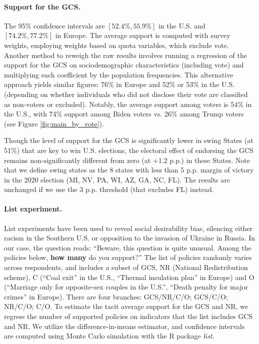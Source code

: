 \begin{bibunit}
\begin{small}
\paragraph{\small Support for the GCS.} 
The 95\% confidence intervals are $[52.4\%, 55.9\%]$ in the U.S. and $[74.2\%, 77.2\%]$ in Europe. The average support is computed with survey weights, employing weights based on quota variables, which exclude vote. Another method to reweigh the raw results involves running a regression of the support for the GCS on sociodemographic characteristics (including vote) and multiplying each coefficient by the population frequencies. This alternative approach yields similar figures: 76\% in Europe and 52\% or 53\% in the U.S. (depending on whether individuals who did not disclose their vote are classified as non-voters or excluded). Notably, the average support among voters is 54\% in the U.S., with 74\% support among Biden voters vs. 26\% among Trump voters (see Figure \ref{fig:main_by_vote}).

Though the level of support for the GCS is significantly lower in swing States (at 51\%) that are key to win U.S. elections, the electoral effect of endorsing the GCS remains non-significantly different from zero (at +1.2 p.p.) in these States. Note that we define swing states as the 8 states with less than 5 p.p. margin of victory in the 2020 election (MI, NV, PA, WI, AZ, GA, NC, FL). The results are unchanged if we use the 3 p.p. threshold (that excludes FL) instead. 

\paragraph{\small List experiment.} %
List experiments have been used to reveal social desirability bias, silencing either racism in the Southern U.S.\citep{kuklinski_racial_1997} or opposition to the invasion of Ukraine in Russia.\citep{chapkovski_solid_2022} %
In our case, the question reads: ``Beware, this question is quite unusual. Among the policies below, \textbf{how many} do you support?'' The list of policies randomly varies across respondents, and includes a subset of GCS, NR (National Redistribution scheme), C (``Coal exit'' in the U.S., ``Thermal insulation plan'' in Europe) and O (``Marriage only for opposite-sex couples in the U.S.'', ``Death penalty for major crimes'' in Europe). There are four branches: GCS/NR/C/O; GCS/C/O; NR/C/O; C/O. To estimate the tacit average support for the GCS and NR, we regress the number of supported policies on indicators that the list includes GCS and NR.
We utilize the difference-in-means estimator, and confidence intervals are computed using Monte Carlo simulation with the R package \textit{list}.\citep{imai_multivariate_2011}


\end{small}
\end{bibunit}
